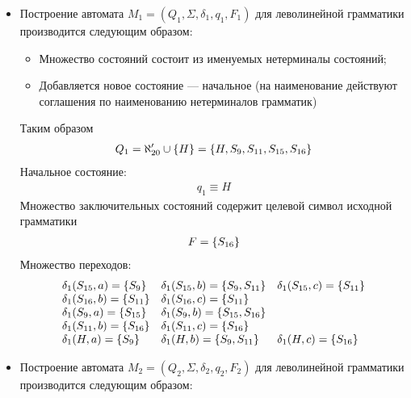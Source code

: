 \begin{itemize}
	\item Построение автомата \(M_1 = (Q_1, \Sigma, \delta_1, q_1, F_1)\) для леволинейной грамматики производится следующим образом:
	      \begin{itemize}
		      \item Множество состояний состоит из именуемых нетерминалы состояний;
		      \item Добавляется новое состояние --- начальное (на наименование действуют соглашения по наименованию нетерминалов грамматик)
	      \end{itemize}
	      Таким образом
	      \begin{align*}
		      Q_1 = \aleph'_{20} \cup \left\{H\right\} = \left\{H, S_9, S_{11}, S_{15}, S_{16}\right\}
	      \end{align*}
	      Начальное состояние:
	      \begin{align*}
		      q_1 \equiv H
	      \end{align*}
	      Множество заключительных состояний содержит целевой символ исходной грамматики
	      \begin{align*}
		      F = \left\{S_{16}\right\}
	      \end{align*}
	      Множество переходов:
	      \begin{align*}
		      \begin{array}{lll}
			      \delta_1(S_{15}, a) = \left\{S_9\right\}    & \delta_1(S_{15}, b) = \left\{S_9, S_{11}\right\}   & \delta_1(S_{15}, c) = \left\{S_{11}\right\} \\
			      \delta_1(S_{16}, b) = \left\{S_{11}\right\} & \delta_1(S_{16}, c) = \left\{S_{11}\right\}                                             \\
			      \delta_1(S_{9}, a) = \left\{S_{15}\right\}  & \delta_1(S_{9}, b) = \left\{S_{15}, S_{16}\right\}                                      \\
			      \delta_1(S_{11}, b) = \left\{S_{16}\right\} & \delta_1(S_{11}, c) = \left\{S_{16}\right\}                                             \\
			      \delta_1(H, a) = \left\{S_{9}\right\}       & \delta_1(H, b) = \left\{S_{9}, S_{11}\right\}      & \delta_1(H, c) = \left\{S_{16}\right\}
		      \end{array}
	      \end{align*}
	\item Построение автомата \(M_2 = (Q_2, \Sigma, \delta_2, q_2, F_2)\) для леволинейной грамматики производится следующим образом:

\end{itemize}
